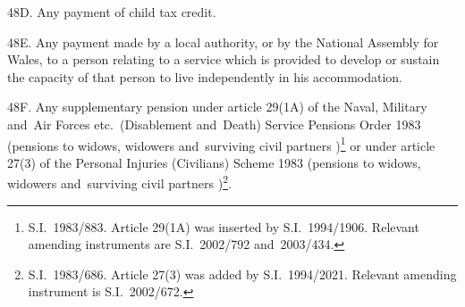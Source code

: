 \documentclass[12pt,a4paper]{article}
\begin{document}
\medskip

48D.  Any payment of child tax credit.


\medskip

%
%

48E.  Any payment made by a local authority, or by the National Assembly for Wales, to a person relating to a service which is provided to develop or sustain the capacity of that person to live independently in his accommodation.


\medskip

48F.  Any supplementary pension under article 29(1A) of the Naval, Military and~Air Forces etc.\ (Disablement and~Death) Service Pensions Order 1983 (pensions to 
widows, widowers and~surviving civil partners%
)\footnote{S.I.\ 1983/883. Article 29(1A) was inserted by S.I.\ 1994/1906. Relevant amending instruments are S.I.\ 2002/792 and~2003/434.} or under article 27(3) of the Personal Injuries (Civilians) Scheme 1983 (pensions to 
widows, widowers and~surviving civil partners%
)\footnote{S.I.\ 1983/686. Article 27(3) was added by S.I.\ 1994/2021. Relevant amending instrument is S.I.\ 2002/672.}.
\end{document}
